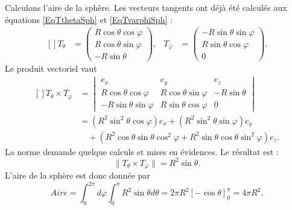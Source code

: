 \begin{example}
    Calculons l'aire de la sphère. Les vecteurs tangents ont déjà été calculés aux équations \eqref{EqTthetaSph} et \eqref{EqTvarphiSph} :
    \begin{equation}
        \begin{aligned}[]
            T_{\theta}&=\begin{pmatrix}
                R\cos\theta\cos\varphi    \\ 
                R\cos\theta\sin\varphi    \\ 
                -R\sin\theta    
            \end{pmatrix},
            &T_{\varphi}&=\begin{pmatrix}
                -R\sin\theta\sin\varphi    \\ 
                R\sin\theta\cos\varphi    \\ 
                0    
            \end{pmatrix}.
        \end{aligned}
    \end{equation}
    Le produit vectoriel vaut
    \begin{equation}
        \begin{aligned}[]
            T_{\theta}\times T_{\varphi}&=
            \begin{vmatrix}
                e_x    &   e_y    &   e_z    \\
             R\cos\theta\cos\varphi   &   R\cos\theta\sin\varphi    &   -R\sin\theta    \\
            -R\sin\theta\sin\varphi    &   R\sin\theta\cos\varphi    &   0
            \end{vmatrix}\\
            &=(R^2\sin^2\theta\cos\varphi)e_x+(R^2\sin^2\theta\sin\varphi)e_y\\
            &\quad +(R^2\cos\theta\sin\theta\cos^2\varphi+R^2\sin\theta\cos\theta \sin^2\varphi)e_z.
        \end{aligned}
    \end{equation}
    La norme demande quelque calculs et mises en évidences. Le résultat est :
    \begin{equation}        \label{EqProdVectTTSPh}
        \| T_{\theta}\times T_{\varphi} \|=R^2\sin\theta.
    \end{equation}
    L'aire de la sphère est donc donnée par
    \begin{equation}
        Aire=\int_0^{2\pi}d\varphi\int_0^{\pi} R^2\sin\theta d\theta=2\pi R^2[-\cos\theta]_0^{\pi}=4\pi R^2.
    \end{equation}
    

\end{example}
